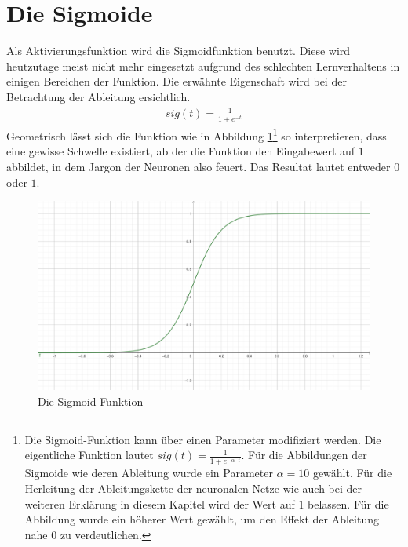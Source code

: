 \section{Die Sigmoide}
Als Aktivierungsfunktion wird die Sigmoidfunktion benutzt. Diese wird heutzutage meist nicht mehr eingesetzt aufgrund
des schlechten Lernverhaltens in einigen Bereichen der Funktion. Die erwähnte Eigenschaft wird bei der Betrachtung
der Ableitung ersichtlich.
\begin{align}
    sig(t) = \frac{1}{1 + e^{-t}}
\end{align}
Geometrisch lässt sich die Funktion wie in Abbildung \ref{fig:02_sigmoide}\footnote{Die Sigmoid-Funktion kann über
einen Parameter modifiziert werden. Die eigentliche Funktion lautet $sig(t) = \frac{1}{1 + e^{-\alpha \cdot t}}$. Für
die Abbildungen der Sigmoide wie deren Ableitung wurde ein Parameter $\alpha = 10$ gewählt. Für die Herleitung
der Ableitungskette der neuronalen Netze wie auch bei der weiteren Erklärung in diesem Kapitel wird der Wert auf $1$
belassen. Für die Abbildung wurde ein höherer Wert gewählt, um den Effekt der Ableitung nahe 0 zu verdeutlichen.} so interpretieren, dass eine gewisse Schwelle existiert, ab der die Funktion
den Eingabewert auf $1$ abbildet, in dem Jargon der Neuronen also \glqq feuert\grqq. Das Resultat lautet
entweder $0$ oder $1$.

\begin{figure}[h!]
    \begin{center}
        \includegraphics[width=0.6\linewidth]{../common/02_appendix/00_resources/02_sigmoide.png}
    \end{center}
    \caption{Die Sigmoid-Funktion}
    \label{fig:02_sigmoide}
\end{figure}

